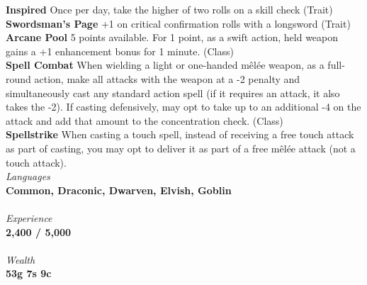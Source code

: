 \documentclass[letterpaper]{article}
\newcommand{\e}[1]{\emph{#1}}
\newcommand{\B}[1]{\textbf{#1}}
\begin{document}
\B{Inspired} Once per day, take the higher of two rolls on a skill check (Trait) \\
\B{Swordsman's Page} +1 on critical confirmation rolls with a longsword (Trait) \\
\B{Arcane Pool} 5 points available. For 1 point, as a swift action, held weapon gains a +1 enhancement bonus for 1 minute. (Class) \\%
\B{Spell Combat} When wielding a light or one-handed m\^{e}l\'{e}e weapon, as a full-round action, make all attacks with the weapon at a -2 penalty and simultaneously cast any standard action spell (if it requires an attack, it also takes the -2). If casting defensively, may opt to take up to an additional -4 on the attack and add that amount to the concentration check. (Class)\\ %
\B{Spellstrike} When casting a touch spell, instead of receiving a free touch attack as part of casting, you may opt to deliver it as part of a free m\^{e}l\'{e}e attack (not a touch attack). 
\\
\e{Languages} \\
\B{Common, Draconic, Dwarven, Elvish, Goblin} \\
\\
{\e{Experience}} \\
\B{2,400 / 5,000} \\
\\
{\e{Wealth}} \\
\B{53g 7s 9c}
\end{document}
